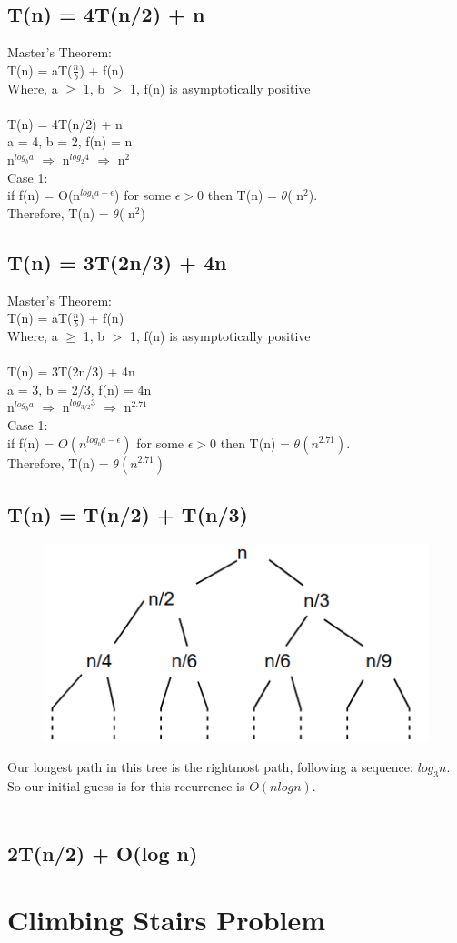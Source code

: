 \documentclass[10pt,letterpaper]{article}
\begin{document}
\subsection{T(n) = 4T(n/2) + n}
Master's Theorem:\\
T(n) = aT($\frac{n}{b}$) + f(n)\\
Where, a $\geq$ 1, b $>$ 1, f(n) is asymptotically positive\\
\\
T(n) = 4T(n/2) + n\\
a = 4, b = 2, f(n) = n\\
n$^{log_{b}a}$ $\Rightarrow$ n$^{log_{2}4}$ $\Rightarrow$ n$^{2}$\\
Case 1:\\
if f(n) = O(n$^{log_{b}a - \epsilon}$) for some $\epsilon > 0$ then T(n) = $\theta$( n$^{2}$).\\
Therefore, T(n) =  $\theta$( n$^{2}$)

\subsection{T(n) = 3T(2n/3) + 4n}
Master's Theorem:\\
T(n) = aT($\frac{n}{b}$) + f(n)\\
Where, a $\geq$ 1, b $>$ 1, f(n) is asymptotically positive\\
\\
T(n) = 3T(2n/3) + 4n\\
a = 3, b = 2/3, f(n) = 4n\\
n$^{log_{b}a}$ $\Rightarrow$ n$^{log_{3/2}3}$ $\Rightarrow$ n$^{2.71}$\\
Case 1:\\
if f(n) = $O(n^{log_{b}a - \epsilon})$ for some $\epsilon > 0$ then T(n) = $\theta(n^{2.71})$.\\
Therefore, T(n) =  $\theta(n^{2.71})$

\subsection{T(n) = T(n/2) + T(n/3)}

\begin{figure}[h]
	\includegraphics[scale = .25]{recurtree1hw5.png}
\end{figure}

\noindent Our longest path in this tree is the rightmost path, following a sequence: $log_{3}n$. So our initial guess is for this recurrence is $O(nlogn)$.\\
\\


\subsection{2T(n/2) + O(log n)}


\section{Climbing Stairs Problem}
\end{document}
